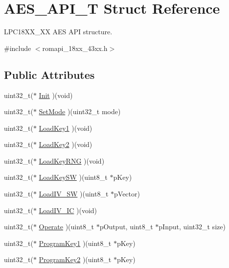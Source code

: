 \hypertarget{struct_a_e_s___a_p_i___t}{}\section{A\+E\+S\+\_\+\+A\+P\+I\+\_\+T Struct Reference}
\label{struct_a_e_s___a_p_i___t}


L\+P\+C18\+X\+X\+\_\+XX A\+ES A\+PI structure.  




{\ttfamily \#include $<$romapi\+\_\+18xx\+\_\+43xx.\+h$>$}

\subsection*{Public Attributes}
\begin{DoxyCompactItemize}
\item 
uint32\+\_\+t($\ast$ \hyperlink{struct_a_e_s___a_p_i___t_a70b9842aadf84d9175469ed161c1d71f}{Init} )(void)
\item 
uint32\+\_\+t($\ast$ \hyperlink{struct_a_e_s___a_p_i___t_a58fcd7ce78a91efd50bb391003b7393d}{Set\+Mode} )(uint32\+\_\+t mode)
\item 
uint32\+\_\+t($\ast$ \hyperlink{struct_a_e_s___a_p_i___t_a3943f0c444ce9f026d3539da8776d471}{Load\+Key1} )(void)
\item 
uint32\+\_\+t($\ast$ \hyperlink{struct_a_e_s___a_p_i___t_a03dd508bbada94a01940593880849d47}{Load\+Key2} )(void)
\item 
uint32\+\_\+t($\ast$ \hyperlink{struct_a_e_s___a_p_i___t_ab687ef80e016cba5e69845d7e12e3a6e}{Load\+Key\+R\+NG} )(void)
\item 
uint32\+\_\+t($\ast$ \hyperlink{struct_a_e_s___a_p_i___t_acb099e457f4f50aa979763bfb73bd6b8}{Load\+Key\+SW} )(uint8\+\_\+t $\ast$p\+Key)
\item 
uint32\+\_\+t($\ast$ \hyperlink{struct_a_e_s___a_p_i___t_a91fdc10db6e94b0c47976090cd94a6a6}{Load\+I\+V\+\_\+\+SW} )(uint8\+\_\+t $\ast$p\+Vector)
\item 
uint32\+\_\+t($\ast$ \hyperlink{struct_a_e_s___a_p_i___t_a01ee2dc971dc20b4efda2aad07da19b0}{Load\+I\+V\+\_\+\+IC} )(void)
\item 
uint32\+\_\+t($\ast$ \hyperlink{struct_a_e_s___a_p_i___t_a6fce2df4e4606eae72464d7a179d52c9}{Operate} )(uint8\+\_\+t $\ast$p\+Output, uint8\+\_\+t $\ast$p\+Input, uint32\+\_\+t size)
\item 
uint32\+\_\+t($\ast$ \hyperlink{struct_a_e_s___a_p_i___t_a6859889046cd07d80c595ac9f72508f0}{Program\+Key1} )(uint8\+\_\+t $\ast$p\+Key)
\item 
uint32\+\_\+t($\ast$ \hyperlink{struct_a_e_s___a_p_i___t_a81c3920e3c035eeb6a76bce343a68ec9}{Program\+Key2} )(uint8\+\_\+t $\ast$p\+Key)
\end{DoxyCompactItemize}


